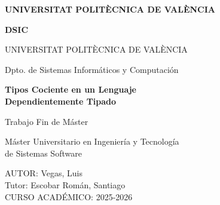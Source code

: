 \documentclass[a4paper,12pt]{report}
\theoremstyle{definition}
\theoremstyle{plain}
\theoremstyle{remark}
\begin{document}
\begin{titlepage}
  \centering

  \begin{minipage}{0.45\textwidth}
    \raggedright
    \textbf{UNIVERSITAT POLIT\`ECNICA DE VAL\`ENCIA}
  \end{minipage}
  \hfill
  \begin{minipage}{0.45\textwidth}
    \raggedleft
    \textbf{DSIC}
  \end{minipage}

  \vspace{2cm}

  {\LARGE UNIVERSITAT POLIT\`ECNICA DE VAL\`ENCIA}

  \vspace{0.5cm}

  {\Large Dpto. de Sistemas Inform\'aticos y Computaci\'on}

  \vspace{1.5cm}

  {\huge\bfseries Tipos Cociente en un Lenguaje\\[0.3cm]
    Dependientemente Tipado}

  \vspace{1.5cm}

  {\Large Trabajo Fin de M\'aster}

  \vspace{0.5cm}

  {\large M\'aster Universitario en Ingenier\'ia y Tecnolog\'ia\\
    de Sistemas Software}

  \vfill

  \begin{flushright}
    AUTOR: Vegas, Luis\\[0.3cm]
    Tutor: Escobar Rom\'an, Santiago\\[0.3cm]
    CURSO ACAD\'EMICO: 2025-2026
  \end{flushright}

\end{titlepage}


\tableofcontents
\end{document}
